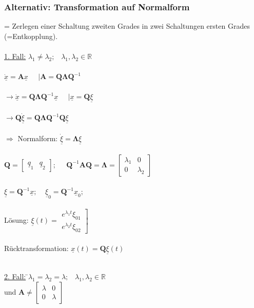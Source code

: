 \documentclass[a4paper,twocolumn,10pt]{article}
\begin{document}
\subsubsection*{Alternativ: Transformation auf Normalform}
= Zerlegen einer Schaltung zweiten Grades in zwei Schaltungen ersten Grades (=Entkopplung).\\\\
\underline{1. Fall:} $\lambda_1 \ne \lambda_2;\;\;\;\lambda_1,\lambda_2\in \mathbb{R}$\\\\
$\underline{\dot{x}}=\textbf{A}\underline{x}\;\;\;\;\;|\textbf{A}=\textbf{Q}\mathbf{\Lambda} \textbf{Q}^{-1}$\\\\
$\rightarrow\underline{\dot{x}}=\textbf{Q}\mathbf{\Lambda} \textbf{Q}^{-1}\underline{x}\;\;\;\;\;|\underline{x}=\textbf{Q}\underline{\xi}$\\\\
$\rightarrow\textbf{Q}\underline{\dot\xi}=\textbf{Q}\mathbf{\Lambda} \textbf{Q}^{-1}\textbf{Q}\underline{\xi}$\\\\
$\Rightarrow$ Normalform: $\underline{\dot{\xi}}= \mathbf{\Lambda} \underline{\xi}$\\\\
$\textbf{Q}=\begin{bmatrix}\underline{q}_1 & \underline{q}_2\end{bmatrix};\;\;\;\;\;\textbf{Q}^{-1}\textbf{A}\textbf{Q}=\mathbf{\Lambda} =\begin{bmatrix}\lambda_1 & 0 \\ 0 & \lambda_2\end{bmatrix}$\\\\
$\underline{\xi}=\textbf{Q}^{-1}\underline{x};\;\;\;\;\underline{\xi}_0=\textbf{Q}^{-1}\underline{x}_0;\;\;\;\;$\\\\
Lösung: $\underline{\xi} (t)=\left.\begin{matrix}e^{\lambda_1 t}\xi_{01} \\ e^{\lambda_2 t}\xi_{02}\end{matrix}\right]$\\\\
Rücktransformation: $\underline{x}(t)=\textbf{Q}\underline{\xi} (t)$
\begin{tabbing}\\
\underline{2. Fall:} \=$\lambda_1 = \lambda_2 =\lambda;\;\;\;\lambda_1,\lambda_2\in \mathbb{R}$\\
\> und $\textbf{A}\neq \begin{bmatrix}\lambda & 0 \\ 0 & \lambda\end{bmatrix}$
\end{tabbing}
\end{document}
